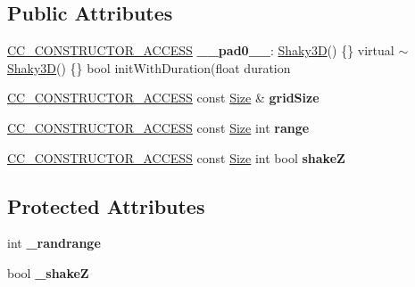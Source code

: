 \subsection*{Public Attributes}
\begin{DoxyCompactItemize}
\item 
\mbox{\label{classShaky3D_ac7317927e02c2067e9893d9efe5fb21b}} 
\hyperlink{_2cocos2d_2cocos_2base_2ccConfig_8h_a25ef1314f97c35a2ed3d029b0ead6da0}{C\+C\+\_\+\+C\+O\+N\+S\+T\+R\+U\+C\+T\+O\+R\+\_\+\+A\+C\+C\+E\+SS} {\bfseries \+\_\+\+\_\+pad0\+\_\+\+\_\+}\+: \hyperlink{classShaky3D}{Shaky3D}() \{\} virtual $\sim$\hyperlink{classShaky3D}{Shaky3D}() \{\} bool init\+With\+Duration(float duration
\item 
\mbox{\label{classShaky3D_a29ee142c25d2bc3888c820ce4587346d}} 
\hyperlink{_2cocos2d_2cocos_2base_2ccConfig_8h_a25ef1314f97c35a2ed3d029b0ead6da0}{C\+C\+\_\+\+C\+O\+N\+S\+T\+R\+U\+C\+T\+O\+R\+\_\+\+A\+C\+C\+E\+SS} const \hyperlink{classSize}{Size} \& {\bfseries grid\+Size}
\item 
\mbox{\label{classShaky3D_a882edec5621af89aca06ca05508254bf}} 
\hyperlink{_2cocos2d_2cocos_2base_2ccConfig_8h_a25ef1314f97c35a2ed3d029b0ead6da0}{C\+C\+\_\+\+C\+O\+N\+S\+T\+R\+U\+C\+T\+O\+R\+\_\+\+A\+C\+C\+E\+SS} const \hyperlink{classSize}{Size} int {\bfseries range}
\item 
\mbox{\label{classShaky3D_aeb41094f1ee5f3f14bad78245735a05e}} 
\hyperlink{_2cocos2d_2cocos_2base_2ccConfig_8h_a25ef1314f97c35a2ed3d029b0ead6da0}{C\+C\+\_\+\+C\+O\+N\+S\+T\+R\+U\+C\+T\+O\+R\+\_\+\+A\+C\+C\+E\+SS} const \hyperlink{classSize}{Size} int bool {\bfseries shakeZ}
\end{DoxyCompactItemize}
\subsection*{Protected Attributes}
\begin{DoxyCompactItemize}
\item 
\mbox{\label{classShaky3D_a6efdd4ca79bb2b17ebafc59754c8878d}} 
int {\bfseries \+\_\+randrange}
\item 
\mbox{\label{classShaky3D_a756d6d9a18aed0c3a8600b1564059144}} 
bool {\bfseries \+\_\+shakeZ}
\end{DoxyCompactItemize}
